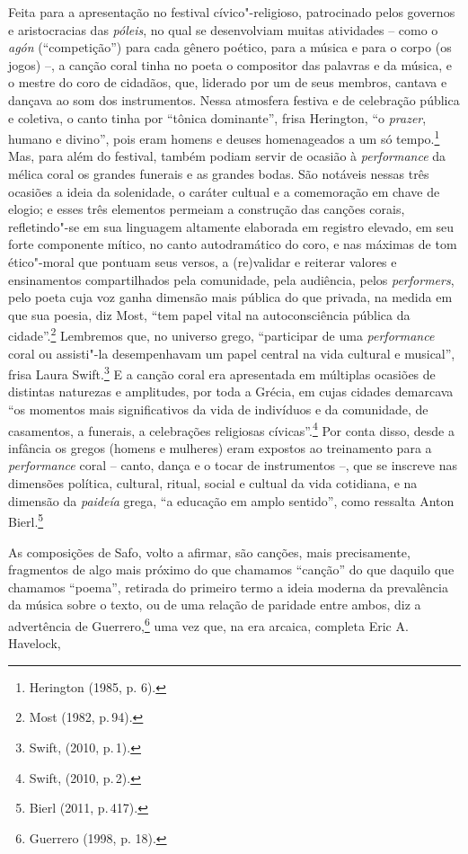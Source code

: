 Feita para a apresentação no festival cívico"-religioso, patrocinado
pelos governos e aristocracias das \textit{póleis}, no qual se
desenvolviam muitas atividades -- como o \textit{agón} (``competição'')
para cada gênero poético, para a música e para o corpo (os jogos) \mbox{--,} a canção coral tinha no poeta o compositor das palavras e
da música, e o mestre do coro de cidadãos, que, liderado por um de seus
membros, cantava e dançava ao som dos instrumentos.
Nessa atmosfera festiva e de celebração pública e coletiva, o canto tinha por
“tônica dominante”, frisa Herington, “o \textit{prazer}, humano e
divino”, pois eram homens e deuses homenageados a um só tempo.\footnote{ Herington (1985, p. 6).} Mas, para além
do festival, também podiam servir de ocasião à
\textit{performance} da mélica coral os grandes funerais e as grandes bodas.
São notáveis nessas três ocasiões a ideia da
solenidade, o caráter cultual e a comemoração em chave de elogio; e esses
três elementos permeiam a construção das canções corais, refletindo"-se
em sua linguagem altamente elaborada em registro elevado, em seu forte
componente mítico, no canto autodramático do coro, e nas máximas de tom
ético"-moral que pontuam seus versos, a (re)validar e reiterar valores e
ensinamentos compartilhados pela comunidade, pela audiência, pelos
\textit{performers}, pelo poeta cuja voz ganha dimensão mais
pública do que privada, na medida em que sua poesia, diz Most,
“tem papel vital na autoconsciência pública da cidade”.\footnote{Most (1982, p.\,94).}
Lembremos que, no universo grego, “participar de uma \textit{performance} coral ou assisti"-la desempenhavam um papel central na vida cultural e musical”, frisa Laura Swift.\footnote{Swift, (2010, p.\,1).} E a canção coral era apresentada em múltiplas ocasiões de distintas naturezas e amplitudes, por toda a Grécia, em cujas cidades demarcava “os momentos mais significativos da vida de indivíduos e da comunidade, de casamentos, a funerais, a celebrações religiosas cívicas”.\footnote{Swift, (2010, p.\,2).} Por conta disso, desde a infância os gregos (homens e mulheres) eram expostos ao treinamento para a \textit{performance} coral -- canto, dança e o tocar de instrumentos --, que se inscreve nas dimensões política, cultural, ritual, social e cultual da vida cotidiana, e na dimensão da \textit{paideía} grega, “a educação em amplo sentido”, como ressalta Anton Bierl.\footnote{Bierl (2011, p.\,417).}

As composições de Safo, volto a afirmar, são canções, mais
precisamente, fragmentos de algo mais próximo do que chamamos “canção” do que
daquilo que chamamos “poema”, retirada do primeiro termo a ideia moderna da
prevalência da música sobre o texto, ou de uma relação de paridade entre ambos,
diz a advertência de Guerrero,\footnote{ Guerrero (1998, p. 18).} uma vez que, na era arcaica,
completa Eric A. Havelock, 

